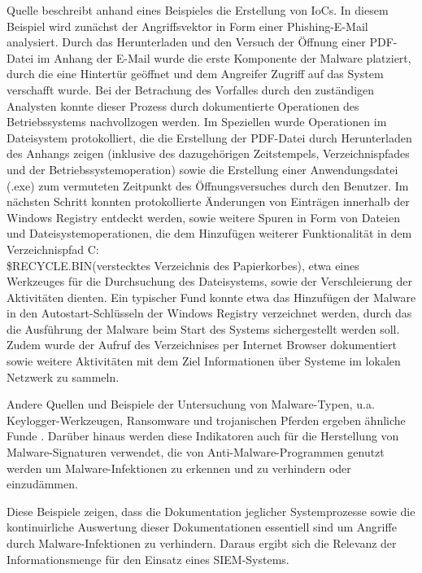 Quelle \citep{EntAnalysis1} beschreibt anhand eines Beispieles die Erstellung von IoCs. In diesem Beispiel wird zunächst der Angriffsvektor in Form einer Phishing-E-Mail analysiert. Durch das Herunterladen und den Versuch der Öffnung einer PDF-Datei im Anhang der E-Mail wurde die erste Komponente der Malware platziert, durch die eine Hintertür geöffnet und dem Angreifer Zugriff auf das System verschafft wurde. Bei der Betrachung des Vorfalles durch den zuständigen Analysten konnte dieser Prozess durch dokumentierte Operationen des Betriebssystems nachvollzogen werden. Im Speziellen wurde Operationen im Dateisystem protokolliert, die die Erstellung der PDF-Datei durch Herunterladen des Anhangs zeigen (inklusive des dazugehörigen Zeitstempels, Verzeichnispfades und der Betriebssystemoperation) sowie die Erstellung einer Anwendungsdatei (.exe) zum vermuteten Zeitpunkt des Öffnungsversuches durch den Benutzer. 
Im nächsten Schritt konnten protokollierte Änderungen von Einträgen innerhalb der Windows Registry entdeckt werden, sowie weitere Spuren in Form von Dateien und Dateisystemoperationen, die dem Hinzufügen weiterer Funktionalität in dem Verzeichnispfad \glqq C:\\ \$RECYCLE.BIN\grqq (verstecktes Verzeichnis des Papierkorbes), etwa eines Werkzeuges für die Durchsuchung des Dateisystems, sowie der Verschleierung der Aktivitäten dienten. Ein typischer Fund konnte etwa das Hinzufügen der Malware in den Autostart-Schlüsseln der Windows Registry verzeichnet werden, durch das die Ausführung der Malware beim Start des Systems sichergestellt werden soll.
Zudem wurde der Aufruf des Verzeichnises per Internet Browser dokumentiert sowie weitere Aktivitäten mit dem Ziel Informationen über Systeme im lokalen Netzwerk zu sammeln. 

Andere Quellen und Beispiele der Untersuchung von Malware-Typen, u.a. Keylogger-Werkzeugen, Ransomware und trojanischen Pferden ergeben ähnliche Funde \citep{EntAnalysis2}. 
Darüber hinaus werden diese Indikatoren auch für die Herstellung von Malware-Signaturen verwendet, die von Anti-Malware-Programmen genutzt werden um Malware-Infektionen zu erkennen und zu verhindern oder einzudämmen.

Diese Beispiele zeigen, dass die Dokumentation jeglicher Systemprozesse sowie die kontinuirliche Auswertung dieser Dokumentationen essentiell sind um Angriffe durch Malware-Infektionen zu verhindern. Daraus ergibt sich die Relevanz der Informationsmenge für den Einsatz eines SIEM-Systems.